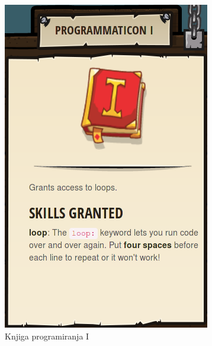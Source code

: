 \begin{figure}[h!]
\begin{subfigure}[]{0.25\textwidth}
      \includegraphics[width=\textwidth]{./images/sc_web/cc_EQ-P1-v01.png}
        \caption{Knjiga programiranja I}
        \label{fig:cc:eq:p1}
      \end{subfigure}
      \qquad
    \begin{subfigure}[]{0.25\textwidth}

\end{subfigure}
\end{figure}
